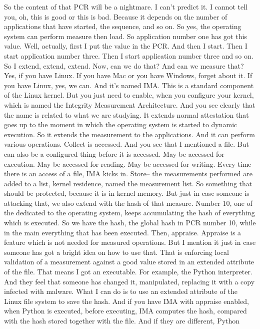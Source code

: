  So the content of that PCR will be a nightmare. I can't predict it. I cannot
 tell you, oh, this is good or this is bad. Because it depends on the number of
 applications that have started, the sequence, and so on. So yes, the operating
 system can perform measure then load. So application number one has got this
 value. Well, actually, first I put the value in the PCR. And then I start.
 Then I start application number three. Then I start application number three
 and so on. So I extend, extend, extend. Now, can we do that? And can we
 measure that? Yes, if you have Linux. If you have Mac or you have Windows,
 forget about it. If you have Linux, yes, we can. And it's named IMA. This is a
 standard component of the Linux kernel. But you just need to enable, when you
 configure your kernel, which is named the Integrity Measurement Architecture.
 And you see clearly that the name is related to what we are studying. It
 extends normal attestation that goes up to the moment in which the operating
 system is started to dynamic execution. So it extends the measurement to the
 applications. And it can perform various operations. Collect is accessed. And
 you see that I mentioned a file. But can also be a configured thing before it
 is accessed. May be accessed for execution. May be accessed for reading. May
 be accessed for writing. Every time there is an access of a file, IMA kicks
 in. Store-- the measurements performed are added to a list, kernel residence,
 named the measurement list. So something that should be protected, because it
 is in kernel memory. But just in case someone is attacking that, we also
 extend with the hash of that measure. Number 10, one of the dedicated to the
 operating system, keeps accumulating the hash of everything which is executed.
 So we have the hash, the global hash in PCR number 10, while in the main
 everything that has been executed. Then, appraise. Appraise is a feature which
 is not needed for measured operations. But I mention it just in case someone
 has got a bright idea on how to use that. That is enforcing local validation
 of a measurement against a good value stored in an extended attribute of the
 file. That means I got an executable. For example, the Python interpreter. And
 they feel that someone has changed it, manipulated, replacing it with a copy
 infected with malware. What I can do is to use an extended attribute of the
 Linux file system to save the hash. And if you have IMA with appraise enabled,
 when Python is executed, before executing, IMA computes the hash, compared
 with the hash stored together with the file. And if they are different, Python
